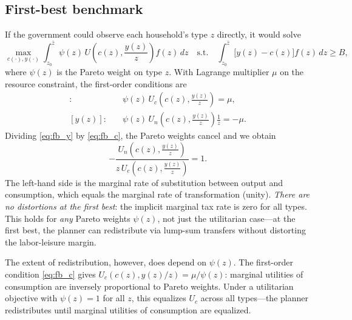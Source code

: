\documentclass[12pt,a4paper]{article}
\theoremstyle{definition}
\theoremstyle{plain}
\theoremstyle{remark}
\newcommand{\zbar}{\bar{z}}
\newcommand{\zlow}{z_{\scriptscriptstyle 0}}
\begin{document}
\subsection{First-best benchmark}

If the government could observe each household's type $z$ directly, it would solve
\[
  \max_{c(\cdot), y(\cdot)} \int_{\zlow}^{\zbar} \psi(z) \, U\!\left(c(z), \frac{y(z)}{z}\right) f(z) \, dz
  \quad \text{s.t.} \quad
  \int_{\zlow}^{\zbar} \bigl[ y(z) - c(z) \bigr] f(z) \, dz \geq B,
\]
where $\psi(z)$ is the Pareto weight on type $z$. With Lagrange multiplier $\mu$ on the resource constraint, the first-order conditions are
\begin{align}
  [c(z)]: & \quad \psi(z) \, U_c\!\left(c(z), \frac{y(z)}{z}\right) = \mu, \label{eq:fb_c} \\[4pt]
  [y(z)]: & \quad \psi(z) \, U_n\!\left(c(z), \frac{y(z)}{z}\right) \frac{1}{z} = -\mu. \label{eq:fb_y}
\end{align}
Dividing \eqref{eq:fb_y} by \eqref{eq:fb_c}, the Pareto weights cancel and we obtain
\begin{equation}
\label{eq:fb_wedge}
  -\frac{U_n\!\left(c(z), \frac{y(z)}{z}\right)}{z \, U_c\!\left(c(z), \frac{y(z)}{z}\right)} = 1.
\end{equation}
The left-hand side is the marginal rate of substitution between output and consumption, which equals the marginal rate of transformation (unity). \emph{There are no distortions at the first best}: the implicit marginal tax rate is zero for all types. This holds for \emph{any} Pareto weights $\psi(z)$, not just the utilitarian case---at the first best, the planner can redistribute via lump-sum transfers without distorting the labor-leisure margin.

The extent of redistribution, however, does depend on $\psi(z)$. The first-order condition \eqref{eq:fb_c} gives $U_c(c(z), y(z)/z) = \mu / \psi(z)$: marginal utilities of consumption are inversely proportional to Pareto weights. Under a utilitarian objective with $\psi(z) = 1$ for all $z$, this equalizes $U_c$ across all types---the planner redistributes until marginal utilities of consumption are equalized.
\end{document}
